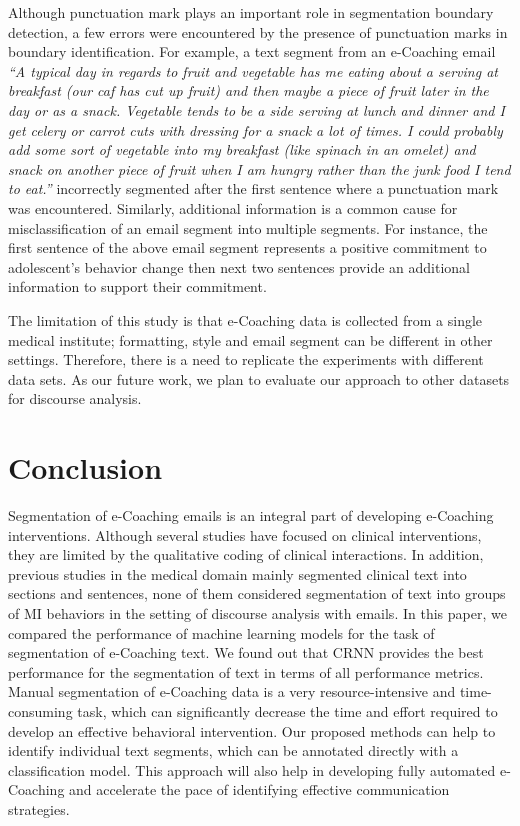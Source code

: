 \documentclass{amia}
\begin{document}
Although punctuation mark plays an important role in segmentation boundary detection, a few errors were encountered by the presence of punctuation marks in boundary identification. For example, a text segment from an e-Coaching email \textit{``A typical day in regards to fruit and vegetable has me eating about a serving at breakfast (our caf has cut up fruit) and then maybe a piece of fruit later in the day or as a snack. Vegetable tends to be a side serving at lunch and dinner and I get celery or carrot cuts with dressing for a snack a lot of times. I could probably add some sort of vegetable into my breakfast (like spinach in an omelet) and snack on another piece of fruit when I am hungry rather than the junk food I tend to eat.''} incorrectly segmented after the first sentence where a punctuation mark was encountered. Similarly, additional information is a common cause for misclassification of an email segment into multiple segments. For instance, the first sentence of the above email segment represents a positive commitment to adolescent's behavior change then next two sentences provide an additional information to support their commitment. 

The limitation of this study is that e-Coaching data is collected from a single medical institute; formatting, style and email segment can be different in other settings. Therefore, there is a need to replicate the experiments with different data sets. As our future work, we plan to evaluate our approach to other datasets for discourse analysis. 
 
\section*{Conclusion}
Segmentation of e-Coaching emails is an integral part of developing e-Coaching interventions. Although several studies have focused on clinical interventions, they are limited by the qualitative coding of clinical interactions. In addition, previous studies in the medical domain mainly segmented clinical text into sections and sentences, none of them considered segmentation of text into groups of MI behaviors in the setting of discourse analysis with emails. In this paper, we compared the performance of machine learning models for the task of segmentation of e-Coaching text. We found out that CRNN provides the best performance for the segmentation of text in terms of all performance metrics. Manual segmentation of e-Coaching data is a very resource-intensive and time-consuming task, which can significantly decrease the time and effort required to develop an effective behavioral intervention. Our proposed methods can help to identify individual text segments, which can be annotated directly with a classification model. This approach will also help in developing fully automated e-Coaching and accelerate the pace of identifying effective communication strategies.
\end{document}
